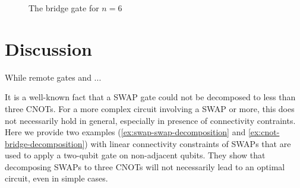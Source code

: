 \documentclass{report}
\begin{document}
\def\qceq{\midstick[6,brackets=none]{=}}
\begin{figure}[h]
  \centering
{}
  \caption{The bridge gate for $n=6$}
\end{figure}


\chapter{Discussion}\label{chap:discussion}

While remote gates and ...

It is a well-known fact that a SWAP gate could not be decomposed to less than three CNOTs. For a more complex circuit involving a SWAP or more, this does not necessarily hold in general, especially in presence of connectivity contraints. Here we provide two examples (\ref{ex:swap-swap-decomposition} and \ref{ex:cnot-bridge-decomposition}) with linear connectivity constraints of SWAPs that are used to apply a two-qubit gate on non-adjacent qubits.
They show that decomposing SWAPs to three CNOTs will not necessarily lead to an optimal circuit, even in simple cases.
\end{document}
